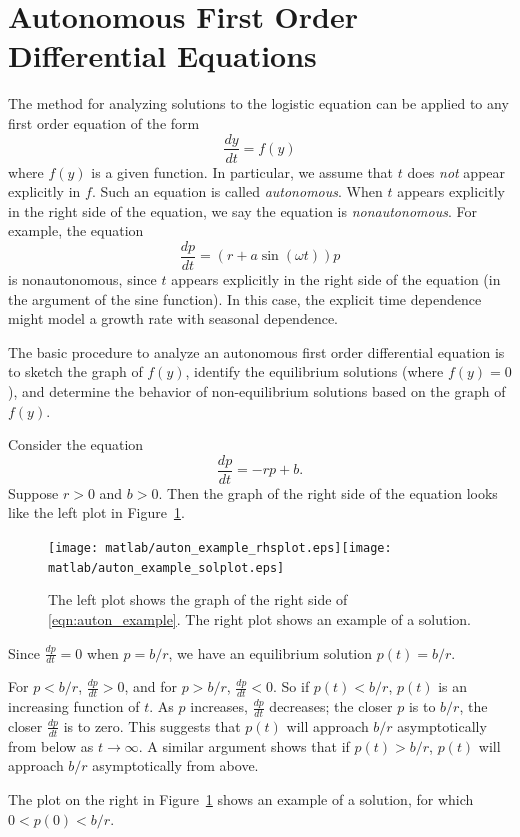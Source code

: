 \section{Autonomous First Order Differential Equations}
The method for analyzing solutions to the logistic equation can be
applied to any first order equation of the form
\begin{equation}
   \frac{dy}{dt} = f(y)
\end{equation}
where $f(y)$ is a given function.
In particular, we assume that $t$ does \emph{not} appear explicitly
in $f$.  Such an equation is called \emph{autonomous}.
When $t$ appears explicitly in the right side of the equation,
we say the equation is \emph{nonautonomous}.
For example, the equation
\begin{equation}
  \frac{dp}{dt} = (r+a \sin(\omega t))p
\end{equation}
is nonautonomous, since $t$ appears explicitly in the right side of the
equation (in the argument of the sine function).
In this case, the explicit time dependence might model a growth
rate with seasonal dependence.

The basic procedure to analyze an autonomous
first order differential equation is to sketch the graph of $f(y)$, identify
the equilibrium solutions (where $f(y)=0$), and determine the
behavior of non-equilibrium solutions based on the graph
of $f(y)$.

\begin{xexample}
Consider the equation
\begin{equation}
\frac{dp}{dt} = -rp + b.
\label{eqn:auton_example}
\end{equation}
Suppose $r > 0$ and $b > 0$.
Then the graph of the right side of the equation looks like
the left plot in Figure~\ref{fig:auton_example_plots}.
\begin{figure}
\centerline{\texttt{[image: matlab/auton\_example\_rhsplot.eps]}\hspace{0.25in}\texttt{[image: matlab/auton\_example\_solplot.eps]}}
\caption{The left plot shows the graph of the right side of \eqref{eqn:auton_example}.
The right plot shows an example of a solution.}
\label{fig:auton_example_plots}
\end{figure}
Since $\frac{dp}{dt} = 0$ when $p = b/r$, we have an
equilibrium solution $p(t) = b/r$.

For $p < b/r$, $\frac{dp}{dt} > 0$, and for
$p > b/r$, $\frac{dp}{dt} < 0$.
So if $p(t) < b/r$, $p(t)$ is an increasing function of
$t$.  As $p$ increases, $\frac{dp}{dt}$ decreases; the closer
$p$ is to $b/r$, the closer $\frac{dp}{dt}$
is to zero.
This suggests that $p(t)$ will approach $b/r$ asymptotically
from below as $t\rightarrow\infty$.
A similar argument shows that if $p(t) > b/r$,
$p(t)$ will approach $b/r$ asymptotically from above.

The plot on the right in Figure~\ref{fig:auton_example_plots}
shows an example of a solution, for which $0 < p(0) < b/r$.
\end{xexample}

